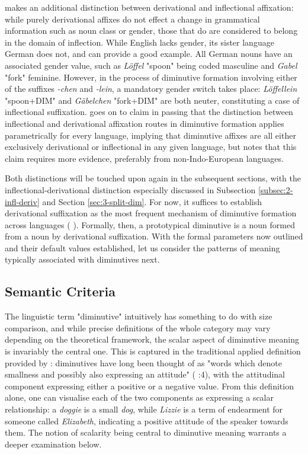 \citeauthor{Schneider+2003} makes an additional distinction between derivational and inflectional affixation: while purely derivational affixes do not effect a change in grammatical information such as noun class or gender, those that do are considered to belong in the domain of inflection. While English lacks gender, its sister language German does not, and can provide a good example. All German nouns have an associated gender value, such as \textit{Löffel} "spoon" being coded masculine and \textit{Gabel} "fork" feminine. However, in the process of diminutive formation involving either of the suffixes \textit{-chen} and \textit{-lein}, a mandatory gender switch takes place: \textit{Löffellein} "spoon+DIM" and \textit{Gäbelchen} "fork+DIM" are both neuter, constituting a case of inflectional suffixation. \citeauthor{Schneider+2003} goes on to claim in passing that the distinction between inflectional and derivational affixation routes in diminutive formation applies parametrically for every language, implying that diminutive affixes are all either exclusively derivational or inflectional in any given language, but notes that this claim requires more evidence, preferably from non-Indo-European languages.

Both distinctions will be touched upon again in the subsequent sections, with the inflectional-derivational distinction especially discussed in Subsection \ref{subsec:2-infl-deriv} and Section \ref{sec:3-split-dim}. For now, it suffices to establish derivational suffixation as the most frequent mechanism of diminutive formation across languages (\citeauthor{Schneider+2003} \citeyear{Schneider+2003}). Formally, then, a prototypical diminutive is a noun formed from a noun by derivational suffixation. With the formal parameters now outlined and their default values established, let us consider the patterns of meaning typically associated with diminutives next.

\subsection{Semantic Criteria}
\label{subsec:2-semantic-crit}
The linguistic term "diminutive" intuitively has something to do with size comparison, and while precise definitions of the whole category may vary depending on the theoretical framework, the scalar aspect of diminutive meaning is invariably the central one. This is captured in the traditional applied definition provided by \citeauthor{Schneider+2003}: diminutives have long been thought of as "words which denote smallness and possibly also expressing an attitude" (\citeauthor{Schneider+2003} \citeyear{Schneider+2003}:4), with the attitudinal component expressing either a positive or a negative value. From this definition alone, one can visualise each of the two components as expressing a scalar relationship: a \textit{doggie} is a small \textit{dog}, while \textit{Lizzie} is a term of endearment for someone called \textit{Elizabeth}, indicating a positive attitude of the speaker towards them. The notion of scalarity being central to diminutive meaning warrants a deeper examination below.

